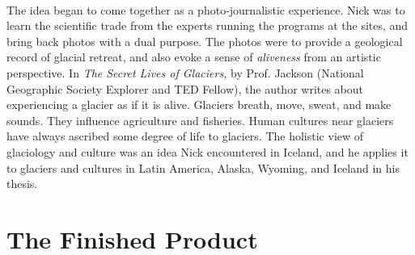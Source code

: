 \documentclass[../../../main.tex]{subfiles}
\begin{document}
\\
\vspace{0.15cm}
The idea began to come together as a photo-journalistic experience.  Nick was to learn the scientific trade from the experts running the programs at the sites, and bring back photos with a dual purpose.  The photos were to provide a geological record of glacial retreat, and also evoke a sense of \textit{aliveness} from an artistic perspective.  In \textit{The Secret Lives of Glaciers,} by Prof. Jackson (National Geographic Society Explorer and TED Fellow), the author writes about experiencing a glacier as if it is alive.  Glaciers breath, move, sweat, and make sounds.  They influence agriculture and fisheries.  Human cultures near glaciers have always ascribed some degree of life to glaciers.  The holistic view of glaciology and culture was an idea Nick encountered in Iceland, and he applies it to glaciers and cultures in Latin America, Alaska, Wyoming, and Iceland in his thesis.

\section{The Finished Product}
\end{document}

